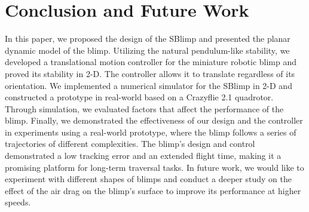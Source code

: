 \documentclass[conference]{ieeeconf}
\begin{document}
\section{Conclusion and Future Work}
In this paper, we proposed the design of the SBlimp and presented the planar dynamic model of the blimp. Utilizing the natural pendulum-like stability, we developed a translational motion controller for the miniature robotic blimp and proved its stability in 2-D. The controller allows it to translate regardless of its orientation. We implemented a numerical simulator for the SBlimp in 2-D and constructed a prototype in real-world based on a Crazyflie 2.1 quadrotor. Through simulation, we evaluated factors that affect the performance of the blimp. 
%
Finally, we demonstrated the effectiveness of our design and the controller in experiments using a real-world prototype, where the blimp follows a series of trajectories of different complexities. 
%
The blimp's design and control demonstrated a low tracking error and an extended flight time, making it a promising platform for long-term traversal tasks.
%
In future work, we would like to experiment with different shapes of blimps and conduct a deeper study on the effect of the air drag on the blimp's surface to improve its performance at higher speeds.

\end{document}
